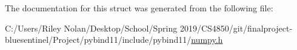 The documentation for this struct was generated from the following file\+:\begin{DoxyCompactItemize}
\item 
C\+:/\+Users/\+Riley Nolan/\+Desktop/\+School/\+Spring 2019/\+C\+S4850/git/finalproject-\/bluesentinel/\+Project/pybind11/include/pybind11/\mbox{\hyperlink{numpy_8h}{numpy.\+h}}\end{DoxyCompactItemize}
